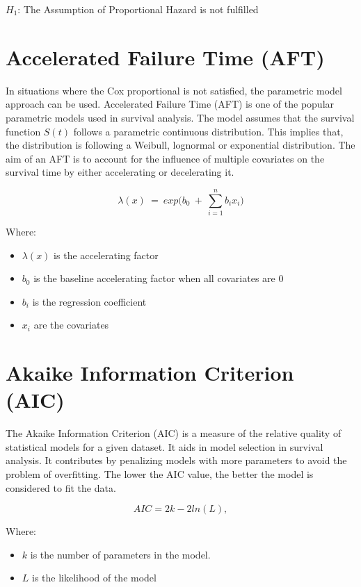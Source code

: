 \documentclass[12pt]{report}
\begin{document}
	\(H_1\): The Assumption of Proportional Hazard is not fulfilled 
	
	
	\section{Accelerated Failure Time (AFT)}
	
	In situations where the Cox proportional is not satisfied, the parametric model approach can be used. Accelerated Failure Time (AFT) is one of the popular parametric models used in survival analysis. The model assumes that the survival function \(S(t)\) follows a parametric continuous distribution. This implies that, the distribution is following a Weibull, lognormal or exponential distribution. The aim of an AFT is to account for the influence of multiple covariates on the survival time by either accelerating or decelerating it.
	
	\[\lambda(x)\ =\ exp(b_0\ +\ \sum_{i=1}^{n}{b_ix_i)}\]
	
	Where:
	\begin{itemize}
		\item \(\lambda(x)\) is the accelerating factor
		\item \(b_0 \) is the baseline accelerating factor when all covariates are 0
		\item \(b_i\) is the regression coefficient
		\item \(x_i\) are the covariates
		
	\end{itemize}
	
	\section{Akaike Information Criterion (AIC)}
	
	The Akaike Information Criterion (AIC) is a measure of the relative quality of statistical models for a given dataset. It aids in model selection in survival analysis. It contributes by penalizing models with more parameters to avoid the problem of overfitting. The lower the AIC value, the better the model is considered to fit the data.
	
	\[AIC=2k-2ln(L),\]
	
	Where:
	\begin{itemize}
		\item \(k \) is the number of parameters in the model.
		\item \(L\) is the likelihood of the model
	\end{itemize}
	
\end{document}
